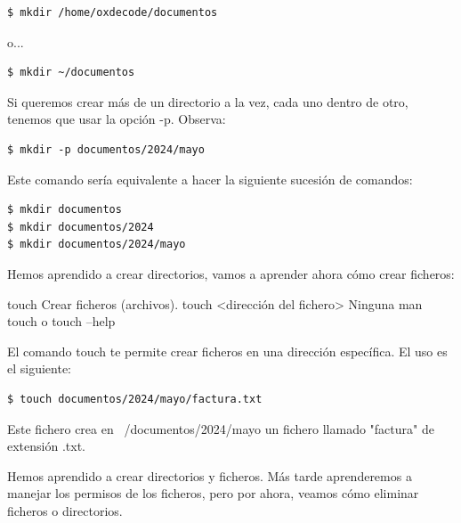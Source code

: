 \begin{tcolorbox-code}
\begin{lstlisting}
$ mkdir /home/oxdecode/documentos
\end{lstlisting}
\end{tcolorbox-code}

o...

\begin{tcolorbox-code}
\begin{lstlisting}
$ mkdir ~/documentos
\end{lstlisting}
\end{tcolorbox-code}

Si queremos crear más de un directorio a la vez, cada uno dentro de otro, tenemos que usar la opción -p. Observa:

\begin{tcolorbox-code}
\begin{lstlisting}
$ mkdir -p documentos/2024/mayo
\end{lstlisting}
\end{tcolorbox-code}

Este comando sería equivalente a hacer la siguiente sucesión de comandos:

\begin{tcolorbox-code}
\begin{lstlisting}
$ mkdir documentos
$ mkdir documentos/2024
$ mkdir documentos/2024/mayo
\end{lstlisting}
\end{tcolorbox-code}

Hemos aprendido a crear directorios, vamos a aprender ahora cómo crear ficheros:

\begin{command-info}
{touch}
{Crear ficheros (archivos).}
{touch <dirección del fichero>}
{Ninguna}
{man touch o touch --help}
\end{command-info}

El comando touch te permite crear ficheros en una dirección específica. El uso es el siguiente:

\begin{tcolorbox-code}
\begin{lstlisting}
$ touch documentos/2024/mayo/factura.txt
\end{lstlisting}
\end{tcolorbox-code}

Este fichero crea en ~/documentos/2024/mayo un fichero llamado "factura" de extensión .txt.

Hemos aprendido a crear directorios y ficheros. Más tarde aprenderemos a manejar los permisos de los ficheros, pero por ahora, veamos cómo eliminar ficheros o directorios.

